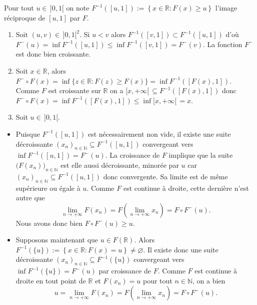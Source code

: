 \begin{preuve}
Pour tout \(u \in\, ]0,1[\) on note
\(F^{-1}\left([u,1]\right) := \left\{x \in \mathbb{R}: F(x) \geq u\right\}\)
l'image réciproque de \([u,1]\) par \(F\).

\begin{enumerate}
\def\labelenumi{\arabic{enumi}.}
\item
  Soit \((u,v) \in\, ]0,1[^2\). Si \(u < v\) alors
  \(F^{-1}\left([v,1]\right) \subset F^{-1}\left([u,1]\right)\) d'où
  \(F^-(u) = \inf F^{-1}\left([u,1]\right) \leq \inf F^{-1}\left([v,1]\right) = F^-(v)\).
  La fonction \(F^-\) est donc bien croissante.
\item
  Soit \(x \in \mathbb{R}\), alors
  \(F^- \circ F(x) = \inf \bigl\{ z \in \mathbb{R}: F(z) \geq F(x) \bigr\} = \inf F^{-1}\left(\left[F(x),1\right]\right)\).
  Comme \(F\) est croissante sur \(\mathbb{R}\) on a
  \([x,+\infty[\, \subseteq F^{-1}\left(\left[F(x),1\right]\right)\)
  donc
  \(F^- \circ F(x) = \inf F^{-1}\left(\left[F(x),1\right]\right) \leq \inf [x,+\infty[\, = x\).
\item
  Soit \(u \in\, ]0,1[\).
\end{enumerate}

\begin{itemize}
\tightlist
\item
  Puisque \(F^{-1}\left([u,1]\right)\) est nécessairement non vide, il
  existe une suite décroissante
  \((x_n)_{n\in\mathbb{N}} \subseteq F^{-1}\left([u,1]\right)\)
  convergeant vers \(\inf F^{-1}\left([u,1]\right) = F^-(u)\). La
  croissance de \(F\) implique que la suite
  \(\bigl(F(x_n)\bigr)_{n\in\mathbb{N}}\) est elle aussi décroissante,
  minorée par \(u\) car
  \((x_n)_{n\in\mathbb{N}} \subseteq F^{-1}\left([u,1]\right)\) donc
  convergente. Sa limite est de même supérieure ou égale à \(u\). Comme
  \(F\) est continue à droite, cette dernière n'est autre que
  \[\lim_{n \rightarrow +\infty} F(x_n) = F\left(\lim_{n\rightarrow+\infty} x_n\right) = F \circ F^-(u).\]
  Nous avons donc bien \(F\circ F^-(u) \geq u\).
\item
  Supposons maintenant que \(u \in F(\mathbb{R})\). Alors
  \(F^{-1}\left(\{u\}\right) := \left\{x \in \mathbb{R}: F(x) = u\right\} \neq \varnothing\).
  Il existe donc une suite décroissante
  \((x_n)_{n\in\mathbb{N}} \subseteq F^{-1}\left(\{u\}\right)\)
  convergeant vers \(\inf F^{-1}\left(\{u\}\right) = F^-(u)\) par
  croissance de \(F\). Comme \(F\) est continue à droite en tout point
  de \(\mathbb{R}\) et \(F(x_n) = u\) pour tout \(n \in \mathbb{N}\), on
  a bien
  \[u = \lim_{n \rightarrow +\infty} F(x_n) = F\left(\lim_{n\rightarrow+\infty} x_n\right) = F \circ F^-(u).\]
\end{itemize}


\end{preuve}
